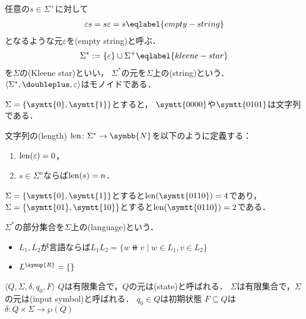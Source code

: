 \documentclass[../main.tex]{subfiles}
\begin{document}
\bigskip

任意の\(s \in \Sigma^{\mathord{+}}\)に対して
\begin{align}
    \varepsilon s = s \varepsilon = s \eqlabel{empty-string}
\end{align}
となるような元\(\varepsilon\)を(empty string)と呼ぶ．
\begin{align}
    \Sigma^{\mathord{*}} := \{\varepsilon\} \cup \Sigma^{\mathord{+}}
    \eqlabel{kleene-star}
\end{align}
を\(\Sigma\)の(Kleene star)といい，
\(\Sigma^{\mathord{*}}\)の元を\(\Sigma\)上の(string)という．
\(\tuple{ \Sigma^*, \doubleplus, \varepsilon }\)はモノイドである．

\begin{exa} \(\Sigma = \{\symtt{0}, \symtt{1}\}\)とすると，
\(\symtt{0000}\)や\(\symtt{0101}\)は文字列である．
\end{exa}

\begin{thmbox}
\begin{definition}
文字列の(length) \(\len\colon \Sigma^{\mathord{*}} \to \symbb{N}\)を以下のように定義する：
\begin{enumerate}
    \item \(\operatorname{len} (\varepsilon) = 0\)，
    \item \(s \in \Sigma^n\)ならば\(\operatorname{len} (s) = n\)．
\end{enumerate}
\end{definition}
\end{thmbox}

\begin{exa} \(\Sigma = \{\symtt{0}, \symtt{1}\}\)とすると\(\len(\symtt{0110}) = 4\)であり，
\(\Sigma = \{\symtt{01}, \symtt{10}\}\)とすると\(\len(\symtt{0110}) = 2\)である．
\end{exa}


\begin{definition} \(\Sigma^{\mathord{*}}\)の部分集合を\(\Sigma\)上の(language)という．
\begin{itemize}
    \item \(L_1, L_2\)が言語ならば\(L_1L_2 = \{ w \doubleplus v \mid w \in L_1, v \in L_2 \}\)
    \item \(L^{\symup{R}} = \{ \}\)
\end{itemize}
\end{definition}


\begin{definition}
\(\langle Q, \Sigma, \delta, q_0, F \rangle\)
\(Q\)は有限集合で，\(Q\)の元は(state)と呼ばれる．
\(\Sigma\)は有限集合で，\(\Sigma\)の元は(input symbol)と呼ばれる．
\(q_0 \in Q\)は初期状態
\(F \subseteq Q\)は
\(\delta\colon Q \times \Sigma \to \wp(Q)\)
\end{definition}
\end{document}
